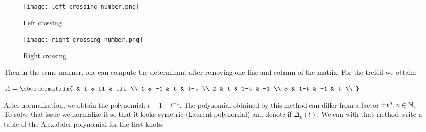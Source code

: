 \documentclass[12pt, a4paper]{article}
\begin{document}
\begin{figure}[H]
  \begin{minipage}[c]{.50\textwidth}
  \centering
  \texttt{[image: left\_crossing\_number.png]}    
  \caption{Left crossing}
  \end{minipage}
  \hfill
  \begin{minipage}[c]{.50\textwidth}
  \centering
  \texttt{[image: right\_crossing\_number.png]}    
  \caption{Right crossing}
  \end{minipage}
  \label{fig:oriented_knot_alexander} 
\end{figure}

Then in the same manner, one can compute the determinant after removing one line and column of the matrix. For the trefoil we obtain:\\

\begin{center}
$
  A = \kbordermatrix{
    & I & II & III \\
    1 & -1 & t & 1-t  \\
    2 & t & 1-t & -1  \\
    3 & 1-t & -1 & t  \\
  }
$
\end{center}

After normalization, we obtain the polynomial: $t - 1 + t^{-1}$. The polynomial obtained by this method can differ from a factor $\pm t^n, n \in \mathbb{N}$. To solve that issue we normalize it so that it looks symetric (Laurent polynomial) and denote if $\Delta_k(t)$. We can with that method write a table of the Alexabder polynomial for the first knots:\\
\end{document}
